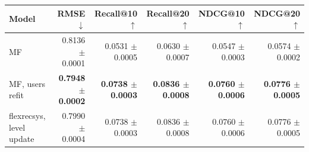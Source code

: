 \begin{tabular}{lrrrrr}
\toprule
Model & RMSE $\downarrow$ & Recall@10 $\uparrow$ & Recall@20 $\uparrow$ & NDCG@10 $\uparrow$ & NDCG@20 $\uparrow$ \\
\midrule
MF & 0.8136 $\pm$ 0.0001 & 0.0531 $\pm$ 0.0005 & 0.0630 $\pm$ 0.0007 & 0.0547 $\pm$ 0.0003 & 0.0574 $\pm$ 0.0002 \\
MF, users refit & \textbf{0.7948 $\pm$ 0.0002} & \textbf{0.0738 $\pm$ 0.0003} & \textbf{0.0836 $\pm$ 0.0008} & \textbf{0.0760 $\pm$ 0.0006} & \textbf{0.0776 $\pm$ 0.0005} \\
flexrecsys, level update & 0.7990 $\pm$ 0.0004 & 0.0738 $\pm$ 0.0003 & 0.0836 $\pm$ 0.0008 & 0.0760 $\pm$ 0.0006 & 0.0776 $\pm$ 0.0005 \\
\bottomrule
\end{tabular}
